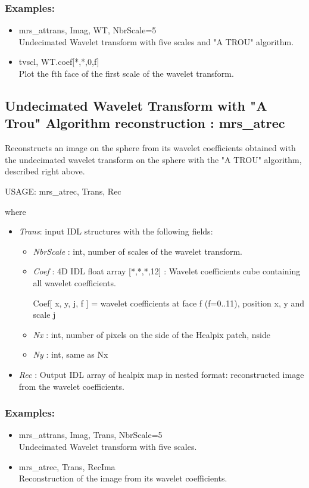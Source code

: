 \subsubsection*{Examples:} 
\begin{itemize}
\item mrs\_attrans, Imag, WT, NbrScale=5 \\
Undecimated Wavelet transform with five scales and "A TROU" algorithm.
\item  tvscl, WT.coef[*,*,0,f] \\
Plot the fth face of the first scale of the wavelet transform.
\end{itemize}


\subsection{Undecimated Wavelet Transform with "A Trou" Algorithm reconstruction : mrs\_atrec}
Reconstructs an image on the sphere from its wavelet coefficients obtained with the undecimated wavelet 
transform on the sphere with the "A TROU" algorithm, described right above.
{\bf
\begin{center}
     USAGE: mrs\_atrec, Trans, Rec
\end{center}}
where 
\begin{itemize}
\item {\em Trans}: input IDL structures with the following fields:  
\begin{itemize}
\item {\em NbrScale} : int, number of scales of the wavelet transform.
\item {\em Coef} : 4D IDL float array [*,*,*,12] : Wavelet coefficients cube containing all wavelet coefficients.
\begin{center}
Coef[ x, y, j, f ] = wavelet coefficients at face f (f=0..11), position x, y and scale j
\end{center}
\item {\em Nx} : int, number of pixels on the side of the Healpix patch, nside
\item {\em Ny} : int, same as Nx
\end{itemize}
\item {\em Rec} : Output IDL array of healpix map in nested format: reconstructed image from the wavelet coefficients. 
\end{itemize}

\subsubsection*{Examples:} 
\begin{itemize}
\item mrs\_attrans, Imag, Trans, NbrScale=5 \\
Undecimated Wavelet transform with five scales.
\item  mrs\_atrec, Trans, RecIma \\
Reconstruction of the image from its wavelet coefficients.
\end{itemize}



